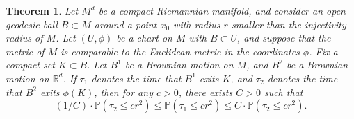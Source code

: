 \documentclass[12pt]{article}
\newtheorem{theorem}{Theorem}
\newcommand*{\R}{\mathbb{R}}
\begin{document}
%
%
%
%

\begin{theorem}
    Let $M^d$ be a compact Riemannian manifold, and consider an open geodesic ball $B \subset M$ around a point $x_0$ with radius $r$ smaller than the injectivity radius of $M$. Let $(U,\phi)$ be a chart on $M$ with $B \subset U$, and suppose that the metric of $M$ is comparable to the Euclidean metric in the coordinates $\phi$. Fix a compact set $K \subset B$. Let $B^1$ be a Brownian motion on $M$, and $B^2$ be a Brownian motion on $\R^d$. If $\tau_1$ denotes the time that $B^1$ exits $K$, and $\tau_2$ denotes the time that $B^2$ exits $\phi(K)$, then for any $c > 0$, there exists $C > 0$ such that
    \[ (1/C) \cdot \mathbb{P}( \tau_2 \leq c r^2 ) \leq \mathbb{P}( \tau_1 \leq c r^2 ) \leq C \cdot \mathbb{P}( \tau_2 \leq c r^2 ). \]
\end{theorem}
\end{document}
